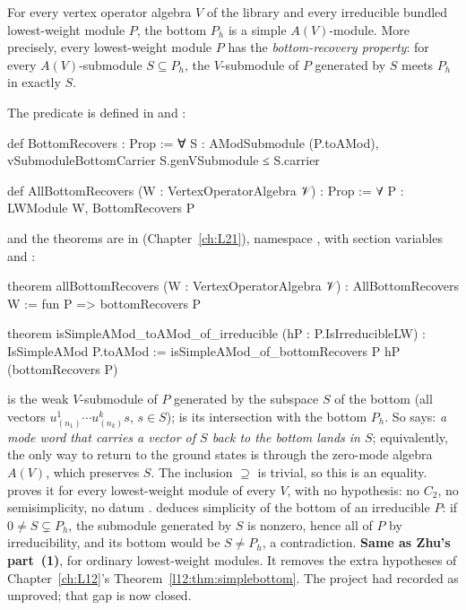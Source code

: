 \begin{theorem}\label{l13:thm:simplebottom-all}
For every vertex operator algebra $V$ of the library and every irreducible bundled lowest-weight module $P$, the bottom
$P_h$ is a simple $A(V)$-module. More precisely, every lowest-weight module $P$ has the \emph{bottom-recovery property}: for
every $A(V)$-submodule $S\subseteq P_h$, the $V$-submodule of $P$ generated by $S$ meets $P_h$ in exactly $S$.
\end{theorem}
\noindent The predicate is defined in  and
:
\begin{leancode}
def BottomRecovers : Prop :=
  ∀ S : AModSubmodule (P.toAMod),
    vSubmoduleBottomCarrier S.genVSubmodule ≤ S.carrier

def AllBottomRecovers (W : VertexOperatorAlgebra 𝒱) : Prop :=
  ∀ P : LWModule W, BottomRecovers P
\end{leancode}
\noindent and the theorems are in  (Chapter~\ref{ch:L21}),
namespace , with section variables  and
:
\begin{leancode}
theorem allBottomRecovers (W : VertexOperatorAlgebra 𝒱) : AllBottomRecovers W :=
  fun P => bottomRecovers P

theorem isSimpleAMod_toAMod_of_irreducible (hP : P.IsIrreducibleLW) : IsSimpleAMod P.toAMod :=
  isSimpleAMod_of_bottomRecovers P hP (bottomRecovers P)
\end{leancode}

\begin{dictionary}
 is the weak $V$-submodule of $P$ generated by the subspace $S$ of the bottom (all vectors
$u^1_{(n_1)}\cdots u^k_{(n_k)}s$, $s\in S$);  is its intersection with the bottom $P_h$. So
 says: \emph{a mode word that carries a vector of $S$ back to the bottom lands in $S$}; equivalently,
the only way to return to the ground states is through the zero-mode algebra $A(V)$, which preserves $S$. The inclusion
$\supseteq$ is trivial, so this is an equality.  proves it for every lowest-weight module of every
$V$, with no hypothesis: no $C_2$, no semisimplicity, no datum .  deduces
simplicity of the bottom of an irreducible $P$: if $0\neq S\subsetneq P_h$, the submodule generated by $S$ is nonzero, hence all
of $P$ by irreducibility, and its bottom would be $S\neq P_h$, a contradiction. \textbf{Same as Zhu's part~(1)}, for ordinary
lowest-weight modules. It removes the extra hypotheses of Chapter~\ref{ch:L12}'s Theorem~\ref{l12:thm:simplebottom}. The
project had recorded  as unproved; that gap is now closed.
\end{dictionary}


